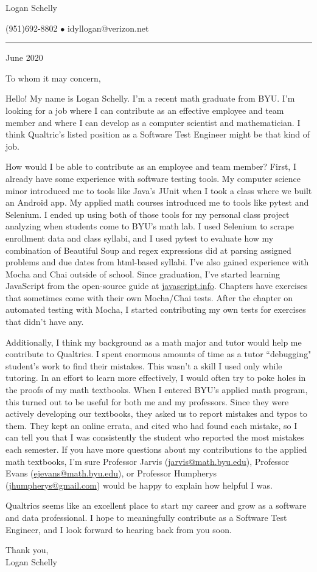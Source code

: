 \documentclass{article}
\begin{document}
\begin{center}
{\Large Logan Schelly}

(951)\phantom{-}692-8802
$\bullet$
idyllogan@verizon.net
\end{center}

\hrule
\bigskip
{} June 2020
\bigskip

To whom it may concern,
\bigskip

Hello!  My name is Logan Schelly.
I'm a recent math graduate from BYU.
I'm looking for a job where I can contribute as an effective employee and team member
and where I can develop as a computer scientist and mathematician.
I think Qualtric's listed position as a Software Test Engineer might be that kind of job.

How would I be able to contribute as an employee and team member?
First, I already have some experience with software testing tools.
My computer science minor introduced me to tools like Java's JUnit
when I took a class where we built an Android app.
My applied math courses introduced me to tools like pytest and Selenium.
I ended up using both of those tools for my personal class project analyzing
when students come to BYU's math lab.
I used Selenium to scrape enrollment data and class syllabi, and I
used pytest to evaluate how my combination of 
Beautiful Soup and regex expressions did at parsing assigned problems and due dates
from html-based syllabi.
I've also gained experience with Mocha and Chai outside of school.
Since graduation, I've started learning JavaScript from the open-source guide at
\href{https://javascript.info}{javascript.info}.
Chapters have exercises that sometimes come with their own Mocha/Chai tests.
After the chapter on automated testing with Mocha, 
I started contributing my own tests for exercises that didn't have any.

Additionally, I think my background as a math major and tutor would help me contribute to Qualtrics.
I spent enormous amounts of time as a tutor ``debugging" student's work to find their mistakes.
This wasn't a skill I used only while tutoring.
In an effort to learn more effectively, I would often try to poke holes in the proofs of my math textbooks.
When I entered BYU's applied math program, this turned out to be useful for both me and my professors.
Since they were actively developing our textbooks, they asked us to report mistakes and typos to them.
They kept an online errata, and cited who had found each mistake, so I can tell you
that I was consistently the student who reported the most mistakes each semester.
If you have more questions about my contributions to the applied math textbooks, I'm sure 
Professor Jarvis (\href{mailto:jarvis@math.byu.edu}{jarvis@math.byu.edu}), 
Professor Evans (\href{mailto:ejevans@math.byu.edu}{ejevans@math.byu.edu}), or 
Professor Humpherys (\href{mailto:jhumpherys@gmail.com}{jhumpherys@gmail.com}) would be happy to explain how helpful I was.

Qualtrics seems like an excellent place to start my career and grow as a software and data professional.
I hope to meaningfully contribute as a Software Test Engineer, and I look forward to hearing back from you soon.

\bigskip
\noindent Thank you,\\
\noindent Logan Schelly
  
\end{document}
